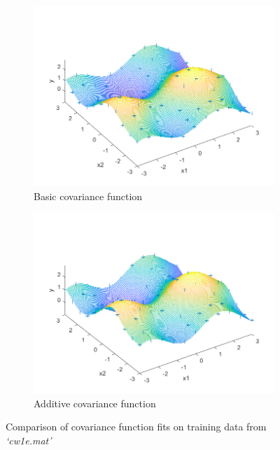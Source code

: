 \documentclass[]{article}
\begin{document}
\begin{figure}[!h]
	\begin{subfigure}{0.5\linewidth}
		\centering
		\includegraphics[width=\linewidth]{1e1}
		\caption{Basic covariance function}
		\label{fig:1e1}
	\end{subfigure}
	\begin{subfigure}{0.5\linewidth}
		\centering
		\includegraphics[width=\linewidth]{1e2}
		\caption{Additive covariance function}
		\label{fig:1e2}
	\end{subfigure}
	\caption{Comparison of covariance function fits on training data from \textit{`cw1e.mat'}}
	\label{fig:1e}
\end{figure}
\end{document}
